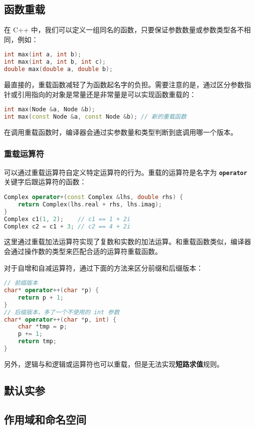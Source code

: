 \documentclass[hyperref,UTF8]{article}
\begin{document}
\subsection{函数重载}

在 C++ 中，我们可以定义一组同名的函数，只要保证参数数量或参数类型各不相同，例如：
\begin{lstlisting}[language=c++]
int max(int a, int b);
int max(int a, int b, int c);
double max(double a, double b);
\end{lstlisting}
最直接的，重载函数减轻了为函数起名字的负担。需要注意的是，通过区分参数指针或引用指向的对象是常量还是非常量是可以实现函数重载的：
\begin{lstlisting}[language=c++]
int max(Node &a, Node &b);
int max(const Node &a, const Node &b); // 新的重载函数
\end{lstlisting}

在调用重载函数时，编译器会通过实参数量和类型判断到底调用哪一个版本。

\subsubsection{重载运算符} \label{sec:overloaded_operator}

可以通过重载运算符自定义特定运算符的行为。重载的运算符是名字为 \textbf{\texttt{operator}} 关键字后跟运算符的函数：
\begin{lstlisting}[language=c++]
Complex operator+(const Complex &lhs, double rhs) {
    return Complex(lhs.real + rhs, lhs.imag);
}
Complex c1(1, 2);    // c1 == 1 + 2i
Complex c2 = c1 + 3; // c2 == 4 + 2i
\end{lstlisting}
这里通过重载加法运算符实现了复数和实数的加法运算。和重载函数类似，编译器会通过操作数的类型来匹配合适的运算符重载函数。

对于自增和自减运算符，通过下面的方法来区分前缀和后缀版本：
\begin{lstlisting}[language=c++]
// 前缀版本
char* operator++(char *p) {
    return p + 1;
}
// 后缀版本，多了一个不使用的 int 参数
char* operator++(char *p, int) {
    char *tmp = p;
    p += 1;
    return tmp;
}
\end{lstlisting}
另外，逻辑与和逻辑或运算符也可以重载，但是无法实现\textbf{短路求值}规则。

\subsection{默认实参}

\subsection{作用域和命名空间} \label{sec:scope}
\end{document}
